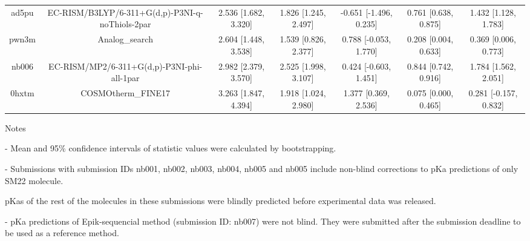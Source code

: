 \documentclass{article}
\begin{document}
\begin{center}
\begin{longtable}{|ccccccc|}
 ad5pu &    EC-RISM/B3LYP/6-311+G(d,p)-P3NI-q-noThiols-2par &  2.536 [1.682, 3.320] &  1.826 [1.245, 2.497] &   -0.651 [-1.496, 0.235] &  0.761 [0.638, 0.875] &   1.432 [1.128, 1.783] \\
 pwn3m &                                     Analog\_search &  2.604 [1.448, 3.538] &  1.539 [0.826, 2.377] &    0.788 [-0.053, 1.770] &  0.208 [0.004, 0.633] &   0.369 [0.006, 0.773] \\
 nb006 &         EC-RISM/MP2/6-311+G(d,p)-P3NI-phi-all-1par &  2.982 [2.379, 3.570] &  2.525 [1.998, 3.107] &    0.424 [-0.603, 1.451] &  0.844 [0.742, 0.916] &   1.784 [1.562, 2.051] \\
 0hxtm &                                 COSMOtherm\_FINE17 &  3.263 [1.847, 4.394] &  1.918 [1.024, 2.980] &     1.377 [0.369, 2.536] &  0.075 [0.000, 0.465] &  0.281 [-0.157, 0.832] \\
\end{longtable}
\end{center}

Notes

- Mean and 95\% confidence intervals of statistic values were calculated by bootstrapping.

- Submissions with submission IDs nb001, nb002, nb003, nb004, nb005 and nb005 include non-blind corrections to pKa predictions of only SM22 molecule.

pKas of the rest of the molecules in these submissions were blindly predicted before experimental data was released.

- pKa predictions of Epik-sequencial method (submission ID: nb007) were not blind. They were submitted after the submission deadline to be used as a reference method.
\end{document}
